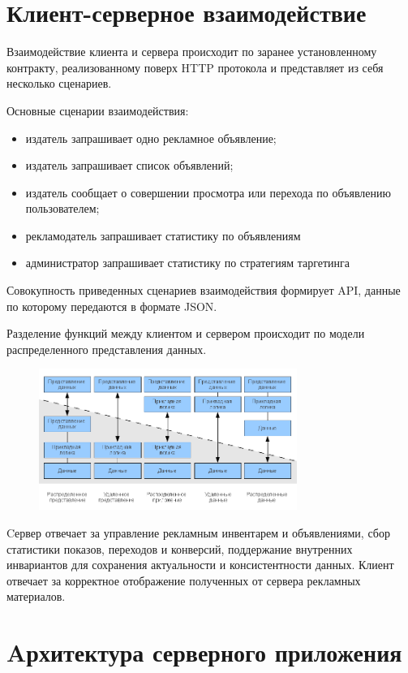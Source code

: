 \documentclass[times]{itmo-student-thesis}
\begin{document}
\section{Клиент-серверное взаимодействие}

Взаимодействие клиента и сервера происходит по заранее установленному контракту, реализованному поверх HTTP протокола и представляет из себя несколько сценариев. 

Основные сценарии взаимодействия:
\begin{itemize}
\item издатель запрашивает одно рекламное объявление;
\item издатель запрашивает список объявлений;
\item издатель сообщает о совершении просмотра или перехода по объявлению пользователем;
\item рекламодатель запрашивает статистику по объявлениям
\item администратор запрашивает статистику по стратегиям таргетинга
\end{itemize}

Совокупность приведенных сценариев взаимодействия формирует API, данные по которому передаются в формате JSON.

Разделение функций между клиентом и сервером происходит по модели распределенного представления данных.

\begin{figure}[h]
\includegraphics[width=0.75\textwidth]{cs-models}
\centering
\end{figure}

Cервер отвечает за управление рекламным инвентарем и объявлениями, сбор статистики показов, переходов и конверсий, поддержание внутренних инвариантов для сохранения актуальности и консистентности данных. Клиент отвечает за корректное отображение полученных от сервера рекламных материалов.

\section{Aрхитектура серверного приложения}
\end{document}
